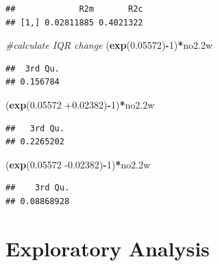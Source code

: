 \documentclass[12pt,]{article}
\newenvironment{Shaded}{\begin{snugshade}}{\end{snugshade}}
\newcommand{\CommentTok}[1]{\textcolor[rgb]{0.56,0.35,0.01}{\textit{#1}}}
\newcommand{\DecValTok}[1]{\textcolor[rgb]{0.00,0.00,0.81}{#1}}
\newcommand{\FloatTok}[1]{\textcolor[rgb]{0.00,0.00,0.81}{#1}}
\newcommand{\KeywordTok}[1]{\textcolor[rgb]{0.13,0.29,0.53}{\textbf{#1}}}
\newcommand{\NormalTok}[1]{#1}
\newcommand{\OperatorTok}[1]{\textcolor[rgb]{0.81,0.36,0.00}{\textbf{#1}}}
\begin{document}
\begin{verbatim}
##             R2m       R2c
## [1,] 0.02811885 0.4021322
\end{verbatim}

\begin{Shaded}
\begin{Highlighting}[]
\CommentTok{#calculate IQR change}
\NormalTok{(}\KeywordTok{exp}\NormalTok{(}\FloatTok{0.05572}\NormalTok{)}\OperatorTok{-}\DecValTok{1}\NormalTok{)}\OperatorTok{*}\NormalTok{no2}\FloatTok{.2}\NormalTok{w}
\end{Highlighting}
\end{Shaded}

\begin{verbatim}
##  3rd Qu. 
## 0.156784
\end{verbatim}

\begin{Shaded}
\begin{Highlighting}[]
\NormalTok{(}\KeywordTok{exp}\NormalTok{(}\FloatTok{0.05572} \FloatTok{+0.02382}\NormalTok{)}\OperatorTok{-}\DecValTok{1}\NormalTok{)}\OperatorTok{*}\NormalTok{no2}\FloatTok{.2}\NormalTok{w}
\end{Highlighting}
\end{Shaded}

\begin{verbatim}
##   3rd Qu. 
## 0.2265202
\end{verbatim}

\begin{Shaded}
\begin{Highlighting}[]
\NormalTok{(}\KeywordTok{exp}\NormalTok{(}\FloatTok{0.05572} \FloatTok{-0.02382}\NormalTok{)}\OperatorTok{-}\DecValTok{1}\NormalTok{)}\OperatorTok{*}\NormalTok{no2}\FloatTok{.2}\NormalTok{w}
\end{Highlighting}
\end{Shaded}

\begin{verbatim}
##    3rd Qu. 
## 0.08868928
\end{verbatim}

\hypertarget{exploratory-analysis}{%
\section{Exploratory Analysis}\label{exploratory-analysis}}
\end{document}
